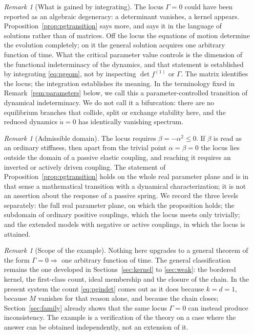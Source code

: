 \documentclass[12pt]{article}
\theoremstyle{plain}
\theoremstyle{definition}
\theoremstyle{remark}
\newtheorem{remark}[theorem]{Remark}
\begin{document}
	\begin{remark}[What is gained by integrating]
		\label{rem:pgstrength}
		The locus $\Gamma=0$ could have been reported as an algebraic degeneracy:
		a determinant vanishes, a kernel appears. Proposition~\ref{prop:pgtransition}
		says more, and says it in the language of solutions rather than of matrices.
		Off the locus the equations of motion determine the evolution completely;
		on it the general solution acquires one arbitrary function of time. What the
		critical parameter value controls is the dimension of the functional
		indeterminacy of the dynamics, and that statement is established by
		integrating \eqref{eq:pgeom}, not by inspecting $\det f^{(1)}$ or $\Gamma$.
		The matrix identifies the locus; the integration establishes its meaning.
		In the terminology fixed in Remark~\ref{rem:parameters} below, we call this
		a parameter-controlled transition of dynamical indeterminacy. We do not call
		it a bifurcation: there are no equilibrium branches that collide, split or
		exchange stability here, and the reduced dynamics $\dot u=0$ has identically
		vanishing spectrum.
	\end{remark}
	
	\begin{remark}[Admissible domain]
		\label{rem:pgdomain}
		The locus requires $\beta=-\alpha^{2}\leq0$. If $\beta$ is read as an
		ordinary stiffness, then apart from the trivial point $\alpha=\beta=0$ the
		locus lies outside the domain of a passive elastic coupling, and reaching it
		requires an inverted or actively driven coupling. The statement of
		Proposition~\ref{prop:pgtransition} holds on the whole real parameter plane
		and is in that sense a mathematical transition with a dynamical
		characterization; it is not an assertion about the response of a passive
		spring. We record the three levels separately: the full real parameter plane,
		on which the proposition holds; the subdomain of ordinary positive
		couplings, which the locus meets only trivially; and the extended models
		with negative or active couplings, in which the locus is attained.
	\end{remark}
	
	\begin{remark}[Scope of the example]
		\label{rem:pgscope}
		Nothing here upgrades to a general theorem of the form
		$\Gamma=0\Rightarrow$ one arbitrary function of time. The general
		classification remains the one developed in
		Sections~\ref{sec:kernel} to \ref{sec:weak}: the bordered kernel, the
		first-class count, ideal membership and the closure of the chain. In the
		present system the count \eqref{eq:pgindet} comes out as it does because
		$k=d=1$, because $M$ vanishes for that reason alone, and because the chain
		closes; Section~\ref{sec:family} already shows that the same locus
		$\Gamma=0$ can instead produce inconsistency. The example is a verification
		of the theory on a case where the answer can be obtained independently, not
		an extension of it.
	\end{remark}
	
\end{document}
